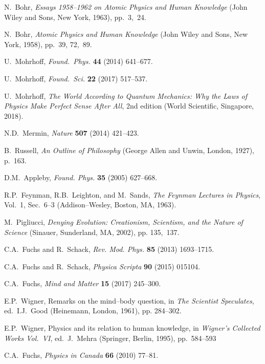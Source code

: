 \documentclass[smallextended]{svjour3}
\begin{document}
\begin{thebibliography}{99}
 N.\ Bohr, \emph{Essays 1958--1962 on Atomic Physics and Human Knowledge} (John Wiley and Sons, New York, 1963), pp.\ 3,~24.

 N.\ Bohr, \emph{Atomic Physics and Human Knowledge} (John Wiley and Sons, New York, 1958),  pp.\ 39, 72,~89.

 U.\ Mohrhoff, \textit{Found.\ Phys.} \textbf{44} (2014) 641--677.

 U.\ Mohrhoff, \emph{Found.\ Sci.} \textbf{22} (2017) 517--537.

 U.\ Mohrhoff, \emph{The World According to Quantum Mechanics: Why the Laws of Physics Make Perfect Sense After All}, 2nd edition (World Scientific, Singapore, 2018).

 N.D.\ Mermin, \emph{Nature} \textbf{507} (2014) 421--423.

 B.\ Russell, \textit{An Outline of Philosophy} (George Allen and Unwin, London, 1927), p.~163.
	
 D.M.\ Appleby, \emph{Found. Phys.} \textbf{35} (2005) 627--668.
	
 R.P.\ Feynman, R.B.\ Leighton, and M.\ Sands, \emph{The Feynman Lectures in Physics}, Vol.~1, Sec.~6--3 (Addison--Wesley, Boston, MA, 1963).
	
 M.\ Pigliucci,  \textit{Denying Evolution: Creationism, Scientism, and the Nature of Science} (Sinauer, Sunderland, MA, 2002), pp. 135,~137.
	
 C.A.\ Fuchs and R.\ Schack, \emph{Rev. Mod. Phys.} \textbf{85} (2013) 1693--1715.

 C.A.\ Fuchs  and R.\ Schack, \textit{Physica Scripta} \textbf{90} (2015) 015104.

 C.A.\ Fuchs, \textit{Mind and Matter} \textbf{15} (2017) 245--300.

 E.P.\ Wigner, Remarks on the mind--body question, in \emph{The Scientist Speculates}, ed.\ I.J.\ Good (Heinemann, London, 1961), pp. 284--302.

 E.P.\ Wigner, Physics and its relation to human knowledge, in \textit{Wigner's Collected Works Vol.\ VI}, ed.\ J.\ Mehra (Springer, Berlin, 1995), pp.\ 584--593 

 C.A.\ Fuchs, \textit{Physics in Canada} \textbf{66} (2010) 77--81.


\end{thebibliography}
\end{document}
